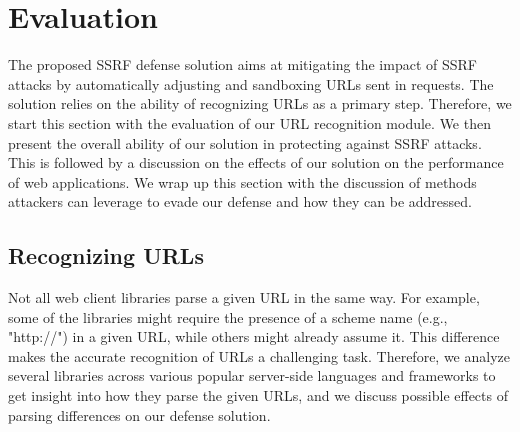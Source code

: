 \section{Evaluation}
\label{sec:evaluation}



The proposed SSRF defense solution aims at mitigating the impact of SSRF attacks by automatically adjusting and sandboxing URLs sent in requests. The solution relies on the ability of recognizing URLs as a primary step. Therefore, we start this section with the evaluation of our URL recognition module. We then present the overall ability of our solution in protecting against SSRF attacks. This is followed by a discussion on the effects of our solution on the performance of web applications. We wrap up this section with the discussion of methods attackers can leverage to evade our defense and how they can be addressed.

\subsection{Recognizing URLs}
Not all web client libraries parse a given URL in the same way. For example, some of the libraries might require the presence of a scheme name (e.g., "http://") in a given URL, while others might already assume it. This difference makes the accurate recognition of URLs a challenging task. Therefore, we analyze several libraries across various popular server-side languages and frameworks to get insight into how they parse the given URLs, and we discuss possible effects of parsing differences on our defense solution.




